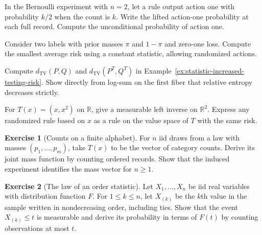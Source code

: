 \documentclass[11pt,oneside]{book}
\theoremstyle{definition}
\newtheorem{exercise}{Exercise}[section]
\theoremstyle{remark}
\newcommand{\R}{\mathbb R}
\begin{document}
\begin{practiceexercise}
\label{pex:statistic-lift-randomized-rule}
In the Bernoulli experiment with $n=2$, let a rule output action
one with probability $k/2$ when the count is $k$. Write the
lifted action-one probability at each full record. Compute the
unconditional probability of action one.
\end{practiceexercise}

\begin{practiceexercise}
\label{pex:statistic-constant-testing-risk}
Consider two labels with prior masses $\pi$ and $1-\pi$ and
zero-one loss. Compute the smallest average risk using a
constant statistic, allowing randomized actions.
\end{practiceexercise}

\begin{practiceexercise}
\label{pex:statistic-testing-example-distances}
Compute $d_{\mathrm{TV}}(P,Q)$ and $d_{\mathrm{TV}}(P^T,Q^T)$ in
Example~\ref{ex:statistic-increased-testing-risk}. Show directly
from log-sum on the first fiber that relative entropy decreases
strictly.
\end{practiceexercise}

\begin{practiceexercise}
\label{pex:statistic-record-left-inverse}
For $T(x)=(x,x^2)$ on $\R$, give a measurable left inverse on
$\R^2$. Express any randomized rule based on $x$ as a rule
on the value space of $T$ with the same risk.
\end{practiceexercise}

\begin{exercise}[Counts on a finite alphabet]
\label{exer:statistic-multinomial-counts}
For $n$ iid draws from a law with masses $(p_1,\ldots,p_m)$,
take $T(x)$ to be the vector of category counts. Derive its
joint mass function by counting ordered records. Show that
the induced experiment identifies the mass vector for $n\geq1$.
\end{exercise}

\begin{exercise}[The law of an order statistic]
\label{exer:statistic-order-distribution}
Let $X_1,\ldots,X_n$ be iid real variables with distribution
function $F$. For $1\leq k\leq n$, let $X_{(k)}$ be the $k$th
value in the sample written in nondecreasing order, including
ties. Show that the event $X_{(k)}\leq t$ is measurable and
derive its probability in terms of $F(t)$ by counting
observations at most $t$.
\end{exercise}
\end{document}
